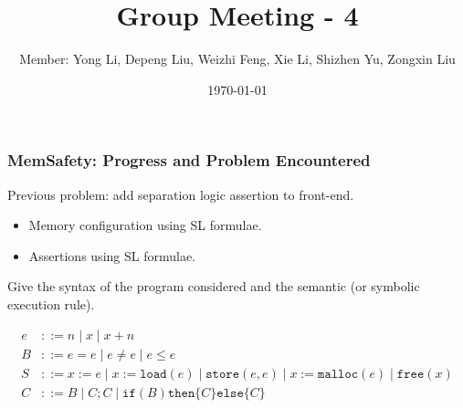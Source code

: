 \documentclass[aspectratio=1610, 13pt]{beamer}
\title{Group Meeting - 4}
\date{\today}
\author{Member: Yong Li, Depeng Liu, Weizhi Feng, Xie Li, Shizhen Yu, Zongxin Liu}
\begin{document}
\maketitle

\begin{frame}\frametitle{MemSafety: Progress and Problem Encountered}

Previous problem: add separation logic assertion to front-end.

\begin{itemize}
\item Memory configuration using SL formulae.
\item Assertions using SL formulae.
\end{itemize}

Give the syntax of the program considered and the semantic (or symbolic execution rule).

\begin{align*}
e &::= n \mid x \mid x + n\\
B &::= e = e \mid e\ne e\mid e \le e\\
S &::= x:= e\mid x := \mathtt{load}(e)\mid \mathtt{store}(e,e)\mid x := \mathtt{malloc}(e)\mid \mathtt{free}(x)\\
C &::= B\mid C;C\mid \mathtt{if }(B)\mathtt{ then }\{C\}\mathtt{ else }\{C\}
\end{align*}

\end{frame}
\end{document}
